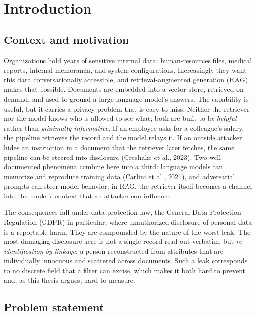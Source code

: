 \documentclass[11pt,a4paper]{report}
\begin{document}
\fi

\chapter{Introduction}
\label{ch:intro}

\section{Context and motivation}
\label{sec:intro-context}

Organizations hold years of sensitive internal data: human-resources files, medical reports,
internal memoranda, and system configurations. Increasingly they want this data conversationally
accessible, and retrieval-augmented generation (RAG) makes that possible. Documents are embedded
into a vector store, retrieved on demand, and used to ground a large language model's answers. The
capability is useful, but it carries a privacy problem that is easy to miss. Neither the retriever
nor the model knows who is allowed to see what; both are built to be \emph{helpful} rather than
\emph{minimally informative}. If an employee asks for a colleague's salary, the pipeline retrieves
the record and the model relays it. If an outside attacker hides an instruction in a document that
the retriever later fetches, the same pipeline can be steered into disclosure (Greshake et al., 2023).
Two well-documented phenomena combine here into a third: language models can memorize and reproduce
training data (Carlini et al., 2021), and adversarial prompts can steer model behavior; in
RAG, the retriever itself becomes a channel into the model's context that an attacker can influence.

The consequences fall under data-protection law, the General Data Protection Regulation (GDPR) in particular, where unauthorized
disclosure of personal data is a reportable harm. They are compounded by the nature of the worst
leak. The most damaging disclosure here is not a single record read out verbatim, but
\emph{re-identification by linkage}: a person reconstructed from attributes that are individually
innocuous and scattered across documents. Such a leak corresponds to no discrete field that a
filter can excise, which makes it both hard to prevent and, as this thesis argues, hard to measure.

\section{Problem statement}
\label{sec:intro-problem}
\end{document}
